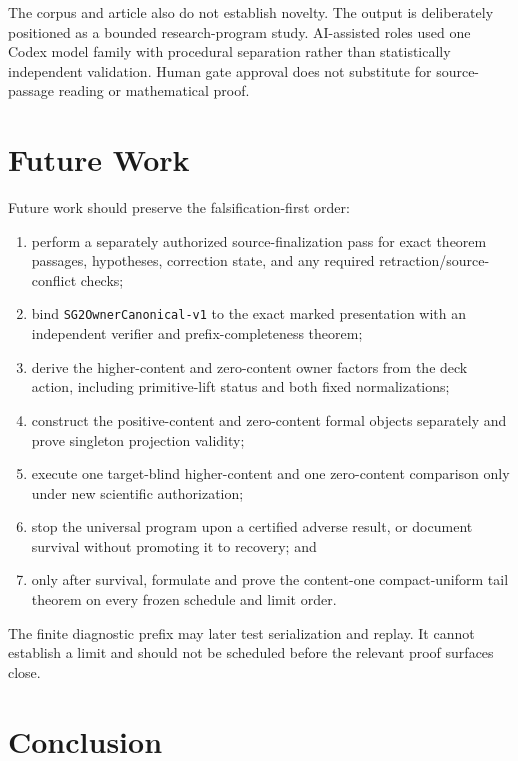\documentclass[11pt]{article}
\providecommand{\tightlist}{\setlength{\itemsep}{0pt}\setlength{\parskip}{0pt}}
\begin{document}
The corpus and article also do not establish novelty. The output is
deliberately positioned as a bounded research-program study.
AI-assisted roles used one Codex model family with procedural separation
rather than statistically independent validation. Human gate approval
does not substitute for source-passage reading or mathematical proof.

\hypertarget{9-future-work}{%
\section{Future Work}\label{9-future-work}}

Future work should preserve the falsification-first order:

\begin{enumerate}
\def\labelenumi{\arabic{enumi}.}
\tightlist
\item
  perform a separately authorized source-finalization pass for exact
  theorem passages, hypotheses, correction state, and any required
  retraction/source-conflict checks;
\item
  bind \texttt{SG2OwnerCanonical-v1} to the exact marked presentation
  with an independent verifier and prefix-completeness theorem;
\item
  derive the higher-content and zero-content owner factors from the deck
  action, including primitive-lift status and both fixed normalizations;
\item
  construct the positive-content and zero-content formal objects
  separately and prove singleton projection validity;
\item
  execute one target-blind higher-content and one zero-content
  comparison only under new scientific authorization;
\item
  stop the universal program upon a certified adverse result, or
  document survival without promoting it to recovery; and
\item
  only after survival, formulate and prove the content-one
  compact-uniform tail theorem on every frozen schedule and limit order.
\end{enumerate}

The finite diagnostic prefix may later test serialization and replay. It
cannot establish a limit and should not be scheduled before the relevant
proof surfaces close.

\hypertarget{10-conclusion}{%
\section{Conclusion}\label{10-conclusion}}
\end{document}
